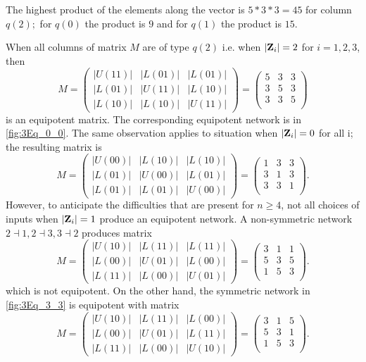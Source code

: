 \documentclass[12pt]{amsart}
\newcommand{\bZ}{{\bf Z}}
\theoremstyle{definition}
\begin{document}
The highest product of the elements along the vector is 
$5*3*3 = 45$ for column $q(2);$ for $q(0)$ the product is $9$ and for $q(1)$ the product is $15$.

When all columns of matrix $M$ are of type $q(2)$ i.e. when $|\bZ_i| = 2$ for $i=1,2,3$, then
\[
M
=
\begin{pmatrix}
|U(11)|&|L(01)| &|L(01)|\\
|L(01)|&|U(11)|&|L(10)|\\
|L(10)|&|L(10)|&|U(11)|
\end{pmatrix}
= 
\begin{pmatrix}
5&3 &3 \\
3&5 &3 \\
3&3 &5 \\
\end{pmatrix}
\]
is an equipotent matrix. 
The corresponding equipotent network is in \cref{fig:3Eq_0_0}. The same observation applies to situation when $|\bZ_i|=0$ for all i; the resulting matrix is 
\[
M
=
\begin{pmatrix}
|U(00)|&|L(10)| &|L(10)|\\
|L(01)|&|U(00)|&|L(01)|\\
|L(01)|&|L(01)|&|U(00)|
\end{pmatrix}
= 
\begin{pmatrix}
1&3 &3 \\
3&1 &3 \\
3&3 &1 \\
\end{pmatrix}.
\]
However, to anticipate the difficulties that are present for $n\geq 4$, not all choices of inputs when $|\bZ_i|=1$ produce an equipotent network. 
A non-symmetric network $2\dashv 1, 2\dashv 3, 3\dashv 2$ produces matrix 
\[
M
=
\begin{pmatrix}
|U(10)|&|L(11)| &|L(11)|\\
|L(00)|&|U(01)|&|L(00)|\\
|L(11)|&|L(00)|&|U(01)|
\end{pmatrix}
= 
\begin{pmatrix}
3& 1 &1 \\
5& 3 &5 \\
1& 5 &3 \\
\end{pmatrix}.
\]
which is not equipotent.
On the other hand, the symmetric network in \cref{fig:3Eq_3_3} is equipotent with matrix 
\[
M
=
\begin{pmatrix}
|U(10)|&|L(11)| &|L(00)|\\
|L(00)|&|U(01)|&|L(11)|\\
|L(11)|&|L(00)|&|U(10)|
\end{pmatrix}
= 
\begin{pmatrix}
3& 1 &5 \\
5& 3 &1 \\
1& 5 &3 \\
\end{pmatrix}.
\]
\end{document}
